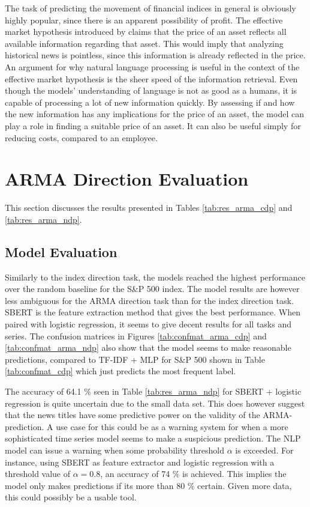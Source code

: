 The task of predicting the movement of financial indices in general is obviously highly popular, since there is an apparent possibility of profit. The effective market hypothesis introduced by \citeauthor{malkiel1970efficient} claims that the price of an asset reflects all available information regarding that asset. This would imply that analyzing historical news is pointless, since this information is already reflected in the price. An argument for why natural language processing is useful in the context of the effective market hypothesis is the sheer speed of the information retrieval. Even though the models' understanding of language is not as good as a humans, it is capable of processing a lot of new information quickly. By assessing if and how the new information has any implications for the price of an asset, the model can play a role in finding a suitable price of an asset. It can also be useful simply for reducing costs, compared to an employee.

\section{ARMA Direction Evaluation}\label{sec:eval_arma}

This section discusses the results presented in Tables \ref{tab:res_arma_cdp} and \ref{tab:res_arma_ndp}.

\subsection{Model Evaluation}

Similarly to the index direction task, the models reached the highest performance over the random baseline for the S\&P 500 index. The model results are however less ambiguous for the ARMA direction task than for the index direction task. SBERT is the feature extraction method that gives the best performance. When paired with logistic regression, it seems to give decent results for all tasks and series. The confusion matrices in Figures \ref{tab:confmat_arma_cdp} and \ref{tab:confmat_arma_ndp} also show that the model seems to make reasonable predictions, compared to TF-IDF + MLP for S\&P 500 shown in Table \ref{tab:confmat_cdp} which just predicts the most frequent label.

The accuracy of 64.1 \% seen in Table \ref{tab:res_arma_ndp} for SBERT + logistic regression is quite uncertain due to the small data set. This does however suggest that the news titles have some predictive power on the validity of the ARMA-prediction. A use case for this could be as a warning system for when a more sophisticated time series model seems to make a suspicious prediction. The NLP model can issue a warning when some probability threshold $\alpha$ is exceeded. For instance, using SBERT as feature extractor and logistic regression with a threshold value of $\alpha = 0.8$, an accuracy of 74 \% is achieved. This implies the model only makes predictions if its more than 80 \% certain. Given more data, this could possibly be a usable tool. 

